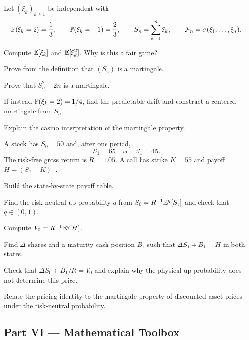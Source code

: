 \begin{exercise}
Let $(\xi_k)_{k\geq1}$ be independent with
\[
\mathbb{P}(\xi_k=2)=\frac13,\qquad \mathbb{P}(\xi_k=-1)=\frac23,
\qquad S_n=\sum_{k=1}^n\xi_k,
\qquad \mathcal F_n=\sigma(\xi_1,\ldots,\xi_n).
\]
\begin{exparts}
  \item Compute $\mathbb{E}[\xi_k]$ and $\mathbb{E}[\xi_k^2]$. Why is this a fair game?
  \item Prove from the definition that $(S_n)$ is a martingale.
  \item Prove that $S_n^2-2n$ is a martingale.
  \item If instead $\mathbb{P}(\xi_k=2)=1/4$, find the predictable drift and
  construct a centered martingale from $S_n$.
  \item Explain the casino interpretation of the martingale property.
\end{exparts}
\end{exercise}

\begin{exercise}
A stock has $S_0=50$ and, after one period,
\[
S_1=65\quad\text{or}\quad S_1=45.
\]
The risk-free gross return is $R=1.05$. A call has strike $K=55$ and payoff
$H=(S_1-K)^+$.
\begin{exparts}
  \item Build the state-by-state payoff table.
  \item Find the risk-neutral up probability $q$ from
  $S_0=R^{-1}\mathbb{E}^q[S_1]$ and check that $q\in(0,1)$.
  \item Compute $V_0=R^{-1}\mathbb{E}^q[H]$.
  \item Find $\Delta$ shares and a maturity cash position $B_1$ such that
  $\Delta S_1+B_1=H$ in both states.
  \item Check that $\Delta S_0+B_1/R=V_0$ and explain why the physical up
  probability does not determine this price.
  \item Relate the pricing identity to the martingale property of discounted
  asset prices under the risk-neutral probability.
\end{exparts}
\end{exercise}

\subsection*{Part VI --- Mathematical Toolbox}

